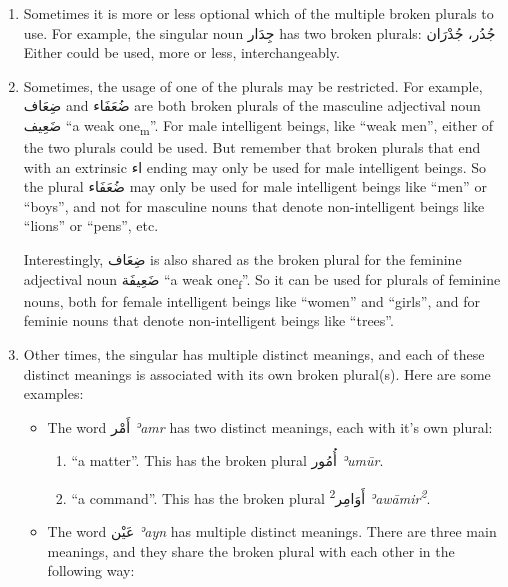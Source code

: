 \documentclass[
  10pt,
]{book}
\providecommand{\tightlist}{%
  \setlength{\itemsep}{0pt}\setlength{\parskip}{0pt}}
\begin{document}
\begin{enumerate}
\def\labelenumi{\arabic{enumi}.}
\item
  Sometimes it is more or less optional which of the multiple broken plurals to use. For example, the singular noun \foreignlanguage{arabic}{جِدَار} has two broken plurals:
  \foreignlanguage{arabic}{جُدُر، جُدْرَان}
  Either could be used, more or less, interchangeably.
\item
  Sometimes, the usage of one of the plurals may be restricted. For example, \foreignlanguage{arabic}{ضِعَاف} and \foreignlanguage{arabic}{ضُعَفَاء} are both broken plurals of the masculine adjectival noun \foreignlanguage{arabic}{ضَعِيف} \enquote{a weak one\textsubscript{m}}. For male intelligent beings, like \enquote{weak men}, either of the two plurals could be used. But remember that broken plurals that end with an extrinsic \foreignlanguage{arabic}{اء} ending may only be used for male intelligent beings. So the plural \foreignlanguage{arabic}{ضُعَفَاء} may only be used for male intelligent beings like \enquote{men} or \enquote{boys}, and not for masculine nouns that denote non-intelligent beings like \enquote{lions} or \enquote{pens}, etc.

  Interestingly, \foreignlanguage{arabic}{ضِعَاف} is also shared as the broken plural for the feminine adjectival noun \foreignlanguage{arabic}{ضَعِيفَة} \enquote{a weak one\textsubscript{f}}. So it can be used for plurals of feminine nouns, both for female intelligent beings like \enquote{women} and \enquote{girls}, and for feminie nouns that denote non-intelligent beings like \enquote{trees}.
\item
  Other times, the singular has multiple distinct meanings, and each of these distinct meanings is associated with its own broken plural(s). Here are some examples:

  \begin{itemize}
  \item
    The word \foreignlanguage{arabic}{أَمْر} \emph{ʾamr} has two distinct meanings, each with it's own plural:

    \begin{enumerate}
    \def\labelenumii{\roman{enumii}.}
    \tightlist
    \item
      \enquote{a matter}. This has the broken plural \foreignlanguage{arabic}{أُمُور} \emph{ʾumūr}.
    \item
      \enquote{a command}. This has the broken plural \foreignlanguage{arabic}{أَوَامِر\textsuperscript{2}} \emph{ʾawāmir\textsuperscript{2}}.
    \end{enumerate}
  \item
    The word \foreignlanguage{arabic}{عَيْن} \emph{ʾayn} has multiple distinct meanings. There are three main meanings, and they share the broken plural with each other in the following way:


\end{itemize}
\end{enumerate}
\end{document}
